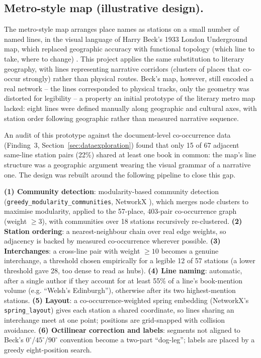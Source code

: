 \documentclass[logo,msc]{infthesis}
\begin{document}
\subsection{Metro-style map (illustrative design).} The metro-style map arranges place names as stations on a small number of named lines, in the visual language of Harry Beck's 1933 London Underground map, which replaced geographic accuracy with functional topology (which line to take, where to change) \cite{beck1933}. This project applies the same substitution to literary geography, with lines representing narrative corridors (clusters of places that co-occur strongly) rather than physical routes. Beck's map, however, still encoded a real network -- the lines corresponded to physical tracks, only the geometry was distorted for legibility -- a property an initial prototype of the literary metro map lacked: eight lines were defined manually along geographic and cultural axes, with station order following geographic rather than measured narrative sequence.

An audit of this prototype against the document-level co-occurrence data (Finding~3, Section~\ref{sec:dataexploration}) found that only 15 of 67 adjacent same-line station pairs (22\%) shared at least one book in common: the map's line structure was a geographic argument wearing the visual grammar of a narrative one. The design was rebuilt around the following pipeline to close this gap.

\textbf{(1) Community detection}: modularity-based community detection (\texttt{greedy\_modularity\_communities}, NetworkX \cite{hagberg2008}), which merges node clusters to maximise modularity, applied to the 57-place, 403-pair co-occurrence graph (weight $\geq 3$), with communities over 18 stations recursively re-clustered. \textbf{(2) Station ordering}: a nearest-neighbour chain over real edge weights, so adjacency is backed by measured co-occurrence wherever possible. \textbf{(3) Interchanges}: a cross-line pair with weight $\geq 10$ becomes a genuine interchange, a threshold chosen empirically for a legible 12 of 57 stations (a lower threshold gave 28, too dense to read as hubs). \textbf{(4) Line naming}: automatic, after a single author if they account for at least 55\% of a line's book-mention volume (e.g. ``Welsh's Edinburgh''), otherwise after its two highest-mention stations. \textbf{(5) Layout}: a co-occurrence-weighted spring embedding (NetworkX's \texttt{spring\_layout}) gives each station a shared coordinate, so lines sharing an interchange meet at one point; positions are grid-snapped with collision avoidance. \textbf{(6) Octilinear correction and labels}: segments not aligned to Beck's $0^\circ$/$45^\circ$/$90^\circ$ convention become a two-part ``dog-leg''; labels are placed by a greedy eight-position search.
\end{document}
